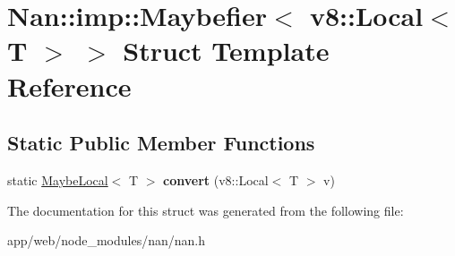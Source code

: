 \hypertarget{struct_nan_1_1imp_1_1_maybefier_3_01v8_1_1_local_3_01_t_01_4_01_4}{}\section{Nan\+:\+:imp\+:\+:Maybefier$<$ v8\+:\+:Local$<$ T $>$ $>$ Struct Template Reference}
\label{struct_nan_1_1imp_1_1_maybefier_3_01v8_1_1_local_3_01_t_01_4_01_4}
\subsection*{Static Public Member Functions}
\begin{DoxyCompactItemize}
\item 
\mbox{\label{struct_nan_1_1imp_1_1_maybefier_3_01v8_1_1_local_3_01_t_01_4_01_4_aec32c43d9c61d18931dfd6710ed7f6cb}} 
static \hyperlink{class_nan_1_1_maybe_local}{Maybe\+Local}$<$ T $>$ {\bfseries convert} (v8\+::\+Local$<$ T $>$ v)
\end{DoxyCompactItemize}


The documentation for this struct was generated from the following file\+:\begin{DoxyCompactItemize}
\item 
app/web/node\+\_\+modules/nan/nan.\+h\end{DoxyCompactItemize}
